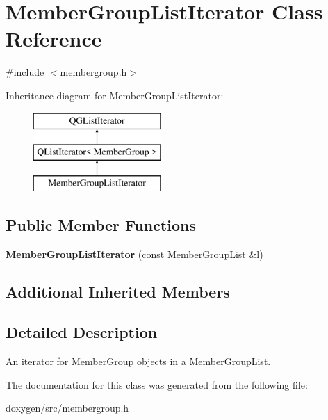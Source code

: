 \hypertarget{class_member_group_list_iterator}{}\section{Member\+Group\+List\+Iterator Class Reference}
\label{class_member_group_list_iterator}


{\ttfamily \#include $<$membergroup.\+h$>$}

Inheritance diagram for Member\+Group\+List\+Iterator\+:\begin{figure}[H]
\begin{center}
\leavevmode
\includegraphics[height=3.000000cm]{class_member_group_list_iterator}
\end{center}
\end{figure}
\subsection*{Public Member Functions}
\begin{DoxyCompactItemize}
\item 
\mbox{\label{class_member_group_list_iterator_a59b53f24c0d48ed19052f0a93f0cbbae}} 
{\bfseries Member\+Group\+List\+Iterator} (const \mbox{\hyperlink{class_member_group_list}{Member\+Group\+List}} \&l)
\end{DoxyCompactItemize}
\subsection*{Additional Inherited Members}


\subsection{Detailed Description}
An iterator for \mbox{\hyperlink{class_member_group}{Member\+Group}} objects in a \mbox{\hyperlink{class_member_group_list}{Member\+Group\+List}}. 

The documentation for this class was generated from the following file\+:\begin{DoxyCompactItemize}
\item 
doxygen/src/membergroup.\+h\end{DoxyCompactItemize}
